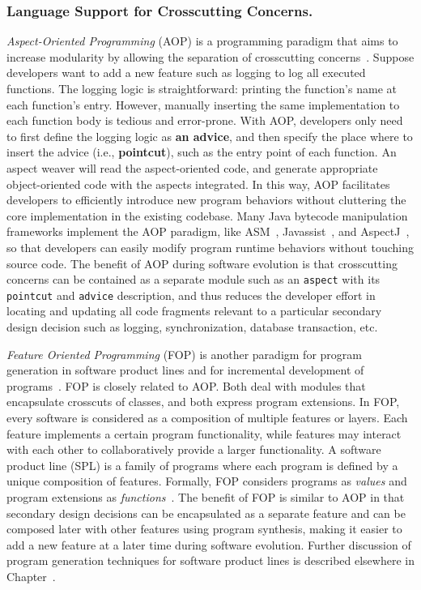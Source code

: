\subsubsection{Language Support for Crosscutting Concerns.}
{\it Aspect-Oriented Programming} (AOP) is a programming paradigm that aims to increase modularity by allowing the separation of crosscutting concerns~\cite{aspectj}. Suppose developers want to add a new feature such as logging to log all executed functions. The logging logic is straightforward: printing the function's name at each function's entry. However, manually inserting the same implementation to each function body is tedious and error-prone. With AOP, developers only need to first define the logging logic as \textbf{an advice}, and then specify the place where to insert the advice (i.e., \textbf{pointcut}), such as the entry point of each function. An aspect weaver will read the aspect-oriented code, and generate appropriate object-oriented code with the aspects integrated. In this way, AOP facilitates developers to efficiently introduce new program behaviors without cluttering the core implementation in the existing codebase. Many Java bytecode manipulation frameworks implement the AOP paradigm, like ASM~\cite{asm}, Javassist~\cite{javassist}, and AspectJ~\cite{aspectj}, so that developers can easily modify program runtime behaviors without touching source code. The benefit of AOP during software evolution is that crosscutting concerns can be contained as a separate module such as an {\tt aspect} with its {\tt pointcut} and {\tt advice} description, and thus reduces the developer effort in locating and updating all code fragments relevant to a particular secondary design decision such as logging, synchronization, database transaction, etc. 

{\it Feature Oriented Programming} (FOP) is another paradigm for program generation in software product lines and for incremental development of programs~\cite{Batory1992:DIH}. FOP is closely related to AOP. Both deal with modules that encapsulate crosscuts of classes, and both express program extensions. In FOP, every software is considered as a composition of multiple features or layers. Each feature implements a certain program functionality, while features may interact with each other to collaboratively provide a larger functionality. A software product line (SPL) is a family of programs where each program is defined by a unique composition of features. Formally, FOP considers programs as \emph{values} and program extensions as \emph{functions}~\cite{Lammel2013:fop}. The benefit of FOP is similar to AOP in that secondary design decisions can be encapsulated as a separate feature and can be composed later with other features using program synthesis, making it easier to add a new feature at a later time during software evolution. Further discussion of program generation techniques for software product lines is described elsewhere in Chapter~.  
  
